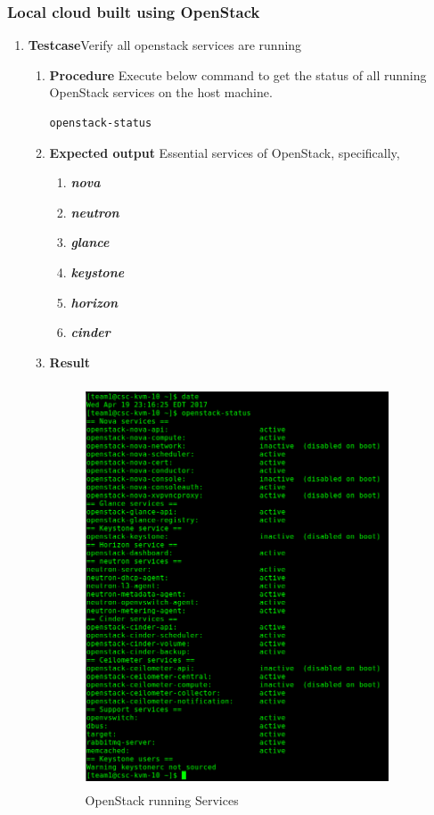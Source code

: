 \subsubsection{Local cloud built using OpenStack}
\begin{enumerate}
\item \textbf{Testcase}\newline Verify all openstack services are running
  \begin{enumerate}[label={}]
  \item \textbf{Procedure}\newline
    Execute below command to get the status of all running OpenStack services on the host machine.
    \begin{lstlisting}[style=Bash]
      openstack-status
    \end{lstlisting}
  \item \textbf{Expected output}\newline
    Essential services of OpenStack, specifically, 
    \begin{enumerate}
    \item \textbf{\textit{nova}}
    \item \textbf{\textit{neutron}}
    \item \textbf{\textit{glance}}
    \item \textbf{\textit{keystone}}
    \item \textbf{\textit{horizon}}
    \item \textbf{\textit{cinder}}
    \end{enumerate}
  \item \textbf{Result}\newline
    \begin{figure}
      \centering
      \includegraphics[height=12cm,width=9cm]{screenshots/openstack-services.png}
      \caption{OpenStack running Services}
      \label{openstack-services}
    \end{figure}


\end{enumerate}
\end{enumerate}
